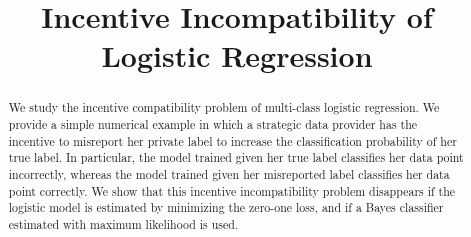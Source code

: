 \documentclass{article}
\title{Incentive Incompatibility of Logistic Regression}
\author{}
\begin{document}
\newtheorem{thm}{Theorem}
\newtheorem{cor}{Corollary}
\newtheorem{lem}{Lemma}
\newtheorem{prop}{Proposition}
\newtheorem{conj}{Conjecture}
\newtheorem{algo}{Algorithm}
\newtheorem{obs}{Observation}
\newtheorem{clm}{Claim}
\theoremstyle{definition}
\newtheorem{df}{Definition}
\newtheorem{eg}{Example}
\newtheorem{asm}{Assumption}
\newtheorem{cond}{Condition}
\theoremstyle{remark}
\newtheorem{rmk}{Remark}
\maketitle \allowdisplaybreaks \raggedbottom
\begin{abstract}
We study the incentive compatibility problem of multi-class logistic regression. We provide a simple numerical example in which a strategic data provider has the incentive to misreport her private label to increase the classification probability of her true label. In particular, the model trained given her true label classifies her data point incorrectly, whereas the model trained given her misreported label classifies her data point correctly. We show that this incentive incompatibility problem disappears if the logistic model is estimated by minimizing the zero-one loss, and if a Bayes classifier estimated with maximum likelihood is used.
\newline \newline

\end{abstract}
\end{document}
